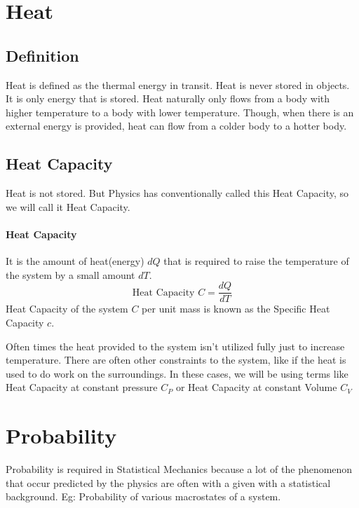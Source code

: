 \documentclass[12pt, oneside]{book}
\begin{document}
\section{Heat}
\subsection{Definition}
Heat is defined as the thermal energy in transit.
Heat is never stored in objects.
It is only energy that is stored.
Heat naturally only flows from a body with higher temperature to a body with lower temperature.
Though, when there is an external energy is provided, heat can flow from a colder body to a hotter body.
\subsection{Heat Capacity}
Heat is not stored.
But Physics has conventionally called this Heat Capacity, so we will call it Heat Capacity.
\paragraph{Heat Capacity} It is the amount of heat(energy) \(dQ\) that is required to raise the temperature of the system by a small amount \(dT\).
\[\text{Heat Capacity }C = \frac{dQ}{dT} \]
Heat Capacity of the system \(C\) per unit mass is known as the Specific Heat Capacity \(c\).

Often times the heat provided to the system isn't utilized fully just to increase temperature.
There are often other constraints to the system, like if the heat is used to do work on the surroundings.
In these cases, we will be using terms like Heat Capacity at constant pressure \(C_P\) or Heat Capacity at constant Volume \(C_V\)

\section{Probability}
Probability is required in Statistical Mechanics because a lot of the phenomenon that occur predicted by the physics are often with a given with a statistical background.
Eg: Probability of various macrostates of a system.
\end{document}
